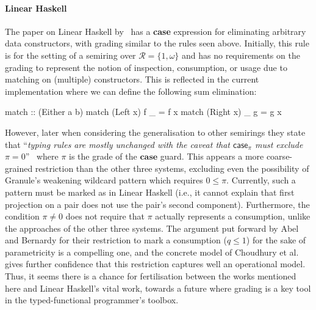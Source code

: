 \paragraph{Linear Haskell}
The paper on Linear Haskell by~\citet{DBLP:journals/pacmpl/BernardyBNJS18} has a \textbf{case}
expression for eliminating arbitrary data constructors, with grading similar to
the rules seen above. Initially, this rule is for the setting of a semiring over
$\mathcal{R} = \{1, \omega\}$ and has no requirements on the grading to
represent the notion of inspection, consumption, or usage due to matching on
(multiple) constructors. This is reflected in the current implementation where
we can define the following sum elimination:
%
\begin{haskell}
match :: (Either a b) %
match (Left x) f _  = f x
match (Right x) _ g = g x
\end{haskell}
%
However, later when considering the generalisation to other semirings they state
that ``\emph{typing rules are mostly unchanged with the caveat that
$\mathsf{case}_\pi$ must exclude $\pi = 0$}''~\citep{DBLP:journals/pacmpl/BernardyBNJS18} where $\pi$ is the grade of the $\textbf{case}$ guard.
This appears a more coarse-grained restriction than the other three systems,
excluding even the possibility of Granule's weakening wildcard pattern which
requires $0 \leq \pi$. Currently, such a pattern must be marked as
 in Linear Haskell (i.e., it cannot explain that first projection
on a pair does not use the pair's second component). Furthermore, the condition
$\pi \neq 0$ does not require that $\pi$ actually represents a consumption,
unlike the approaches of the other three systems.
%
The argument put forward by Abel and Bernardy for their restriction to mark a
consumption ($q \leq 1$) for the sake of parametricity is a compelling one, and
the concrete model of Choudhury et al. gives further confidence that this
restriction captures well an operational model. Thus, it seems there is a chance
for fertilisation between the works mentioned here and Linear Haskell's vital
work, towards a future where grading is a key tool in the typed-functional
programmer's toolbox.


